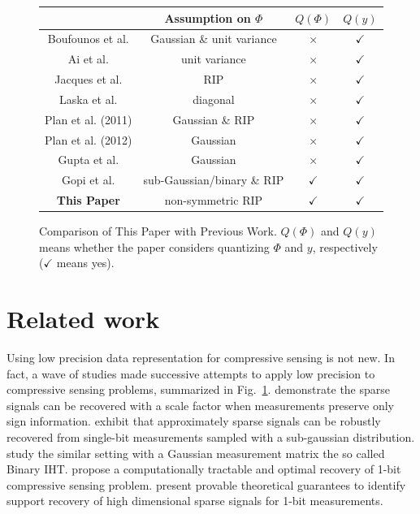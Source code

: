 \documentclass{article}
\begin{document}
\begin{figure}[t]
\scriptsize
\centering
\begin{tabular}{c|c|cc}
\hline
                   & Assumption on $\Phi$ & $Q(\Phi)$ & $Q(y)$ \\
\hline
 Boufounos et al.
 & Gaussian \& unit variance &$\times$ & $\checkmark$\\
 Ai et al.         & unit variance &$\times$ & $\checkmark$\\
 Jacques et al.     &  RIP & $\times$& $\checkmark$\\
 Laska et al.     & diagonal &$\times$ & $\checkmark$\\
 Plan et al. (2011)     & Gaussian \& RIP &$\times$ & $\checkmark$\\
 Plan et al. (2012)      & Gaussian &$\times$ & $\checkmark$\\
 Gupta et al.     & Gaussian &$\times$ & $\checkmark$\\
 Gopi et al.       & sub-Gaussian/binary \& RIP &$\checkmark$ & $\checkmark$\\
\hline
  {\bf This Paper}                & non-symmetric RIP & $\checkmark$ & $\checkmark$ \\
\hline
\end{tabular}
\vspace{-1em}
\caption{Comparison of This Paper with Previous Work. $Q(\Phi)$ and $Q(y)$ means whether
the paper considers quantizing $\Phi$ and $y$,
respectively ($\checkmark$ means yes).}
\label{tab:cs}
\vspace{-2em}
\end{figure}



\vspace{-1em}
\section{Related work}\label{section_related_work}
\vspace{-0.5em}

Using low precision data representation for compressive sensing
is not new. In fact, a wave of studies made successive attempts to apply low precision  
to compressive sensing problems, summarized in
Fig.~\ref{tab:cs}. \cite{boufounos20091bitcs} demonstrate the sparse signals can be recovered with a scale factor when measurements preserve only sign information. \cite{ai20121bitcs, davenport20121bit} exhibit that approximately sparse signals can be robustly recovered from single-bit measurements sampled with a sub-gaussian distribution. \cite{jacques20111bit, laska20111bitcs} study the similar setting with a Gaussian measurement matrix the so called Binary IHT. \cite{plan20111bitcs, plan20121bitcs} propose a computationally tractable and optimal recovery of 1-bit compressive sensing problem. \cite{recht20121bitcs, gopi20131bitcs} present provable theoretical guarantees to identify support recovery of high dimensional sparse signals for 1-bit measurements. 
\end{document}
